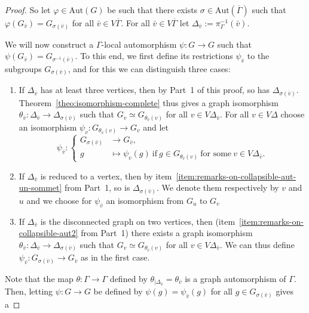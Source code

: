 \documentclass[a4paper,english,11pt]{article}
\theoremstyle{definition}
\theoremstyle{remark}
\newcommand{\Aut}{\mathrm{Aut}}
\begin{document}
\begin{proof}
So let $\varphi\in \Aut(G)$ be such that there exists $\sigma\in \Aut(\overline{\Gamma})$ such that $\varphi(G_{\bar{v}})=G_{\sigma(\bar v)}$ for all $\bar{v}\in V\overline{\Gamma}$. For all
$\bar{v}\in V\overline{\Gamma}$ let $\Delta_{\bar{v}}:=\pi^{-1}_{\Gamma}(\bar{v})$.  

We will now construct a $\Gamma$-local automorphism $\psi:G\to G$ such that $\psi(G_{\bar v})=G_{\sigma^{-1}(\bar v)}$. To this end, we first define its restrictions $\psi_{\bar v}$ to the subgroups $G_{\sigma(\bar v)}$, and for this we can distinguish three cases:
\begin{enumerate}
    \item If $\Delta_{\bar{v}}$ has at least three vertices, then by Part~1 of this proof, so has $\Delta_{\sigma(\bar v)}$. Theorem~\ref{theo:isomorphism-complete} thus gives a graph isomorphism $\theta_{\bar{v}} : \Delta_{\bar{v}} \rightarrow \Delta_{\sigma(\bar{v})}$ such that $G_{v}\simeq G_{\theta_{\bar{v}} (v)}$ for all $v\in V\Delta_{\bar{v}}$.
   For all $v\in V\Delta$ choose an isomorphism $\psi_v:G_{\theta_{\bar{v}}(v)} \rightarrow G_v$ and let 
   \begin{equation*}
        \psi_{\bar{v}}:
        \begin{cases}
        G_{\sigma(\bar{v})}&\rightarrow G_{\bar{v}},\\
        g&\mapsto   \psi_v(g)\ \text{if}\ g\in G_{\theta_{\bar{v}}(v)} \ \text{for some}\ v\in V\Delta_{\bar{v}}.
        \end{cases}
    \end{equation*}
    \item If $\Delta_{\bar{v}}$ is reduced to a vertex, then by item~\ref{item:remarks-on-collapsible-aut-un-sommet} from Part~1, so is $\Delta_{\sigma(\bar{v})}$. We denote them respectively by $v$ and $u$ and we choose for $\psi_{\bar v}$ an isomorphism from $G_u$ to $G_v$
    \item If $\Delta_{\bar{v}}$ is the disconnected graph on two vertices, then (item~\ref{item:remarks-on-collapsible-aut2} from Part~1) there exists a graph isomorphism $\theta_{\bar{v}}:\Delta_{\bar{v}}\rightarrow \Delta_{\sigma(\bar{v})}$ such that $G_{v}\simeq G_{\theta_{\bar{v}}(v)}$ for all $v\in V\Delta_{\bar{v}}$. We can thus define $\psi_{\bar{v}}:G_{\sigma(\bar{v})}\rightarrow G_{\bar{v}}$ as in the first case. 
\end{enumerate}
Note that the map $\theta:\Gamma\rightarrow \Gamma$ defined by $\theta_{|\Delta_{\bar{v}}}= \theta_{\bar{v}}$ is a graph automorphism of $\Gamma$. Then, letting $\psi:G\rightarrow G$ be defined by $\psi(g)=\psi_{\bar{v}}(g)$ for all $g\in G_{\sigma(\bar{v})}$ gives a 

\end{proof}
\end{document}
